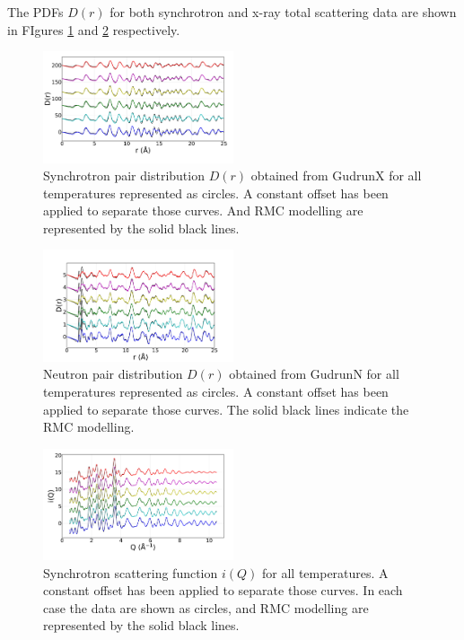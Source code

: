 \documentclass[twoside,twocolumn,9pt]{article}
\begin{document}
The PDFs $D(r)$ for both synchrotron and x-ray total scattering data are shown in FIgures \ref{fig:xpdf} and \ref{fig:npdf} respectively.

\begin{figure}[t]
\centering
\includegraphics[width=0.5\textwidth]{Pics/xpdf.pdf}
\caption{Synchrotron pair distribution $D(r)$ obtained from GudrunX for all temperatures represented as circles.
         A constant offset has been applied to separate those curves.
         And RMC modelling are represented by the solid black lines.}
\label{fig:xpdf}
\end{figure}

\begin{figure}[t]
\centering
\includegraphics[width=0.5\textwidth]{Pics/npdf.pdf}
\caption{Neutron pair distribution $D(r)$  obtained from GudrunN for all temperatures represented as circles.
         A constant offset has been applied to separate those curves.
         The solid black lines indicate the  RMC modelling. }
\label{fig:npdf}
\end{figure}

\begin{figure}[t]
\centering
\includegraphics[width=0.5\textwidth]{Pics/xsoq.pdf}
\caption{Synchrotron scattering function $i(Q)$ for all temperatures.
A constant offset has been applied to separate those curves.
In each case the data are shown as circles,
and RMC modelling are represented by the solid black lines.}
\label{fig:xsoq}
\end{figure}
\end{document}
